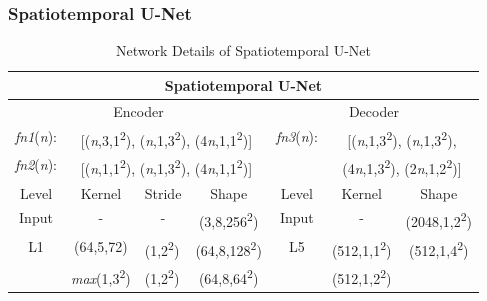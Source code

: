 \documentclass[lettersize,journal]{IEEEtran}
\begin{document}
\subsubsection{Spatiotemporal U-Net}
\begin{table}[!t]
	\centering
	\caption{Network Details of Spatiotemporal U-Net}
	\label{tab1}
	\setlength\tabcolsep{0.9pt}
	\begin{tabular}{@{}cclcccc@{}}
		\toprule
		\multicolumn{7}{c}{Spatiotemporal U-Net}                                                                                                                           \\ \midrule
		\multicolumn{4}{c}{Encoder}                                                                      & \multicolumn{3}{c}{Decoder}                                             \\ \midrule
		\textit{fn1}(\textit{n}):             & \multicolumn{3}{c}{{[}(\textit{n},3,1\textsuperscript{2}), (\textit{n},1,3\textsuperscript{2}),   (4\textit{n},1,1\textsuperscript{2}){]}}                  & \multirow{2}{*}{\textit{fn3}(\textit{n}):} & \multicolumn{2}{c}{{[}(\textit{n},1,3\textsuperscript{2}), (\textit{n},1,3\textsuperscript{2}),}~~~   \\ \cmidrule(lr){1-4}
		\textit{fn2}(\textit{n}):             & \multicolumn{3}{c}{{[}(\textit{n},1,1\textsuperscript{2}), (\textit{n},1,3\textsuperscript{2}),   (4\textit{n},1,1\textsuperscript{2}){]}}                  &                          & \multicolumn{2}{c}{(4\textit{n},1,3\textsuperscript{2}), (2\textit{n},1,2\textsuperscript{2})\textsuperscript{}{]}} \\ \midrule
		Level               & Kernel        & \multicolumn{1}{c}{Stride} & Shape                        & Level                    & Kernel        & Shape                       \\ \midrule
		Input               & -             & \multicolumn{1}{c}{-}      & (3,8,256\textsuperscript{2})                    & Input                    & -             & (2048,1,2\textsuperscript{2})                  \\ \midrule
		\multirow{4}{*}{L1} & (64,5,72)     & (1,2\textsuperscript{2})                     & (64,8,128\textsuperscript{2})                   & \multirow{4}{*}{L5}      & (512,1,1\textsuperscript{2})    & \multirow{2}{*}{(512,1,4\textsuperscript{2})}  \\ \cmidrule(lr){2-4}
		& \textit{max}(1,3\textsuperscript{2})     & (1,2\textsuperscript{2})                     & (64,8,64\textsuperscript{2})                    &                          & (512,1,2\textsuperscript{2})\textsuperscript{}   &                              \\ \cmidrule(lr){2-4} \cmidrule(l){6-7} 

\end{tabular}
\end{table}
\end{document}
